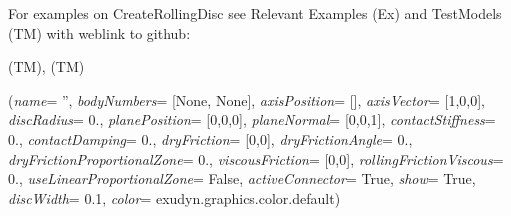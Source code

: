 %
\noindent For examples on CreateRollingDisc see Relevant Examples (Ex) and TestModels (TM) with weblink to github:
\bi
 \item \footnotesize {} (TM), 
 (TM)
\ei

%
\begin{flushleft}
\label{sec:mainsystemextensions:CreateRollingDiscPenalty}
({\it name}= '', {\it bodyNumbers}= [None, None], {\it axisPosition}= [], {\it axisVector}= [1,0,0], {\it discRadius}= 0., {\it planePosition}= [0,0,0], {\it planeNormal}= [0,0,1], {\it contactStiffness}= 0., {\it contactDamping}= 0., {\it dryFriction}= [0,0], {\it dryFrictionAngle}= 0., {\it dryFrictionProportionalZone}= 0., {\it viscousFriction}= [0,0], {\it rollingFrictionViscous}= 0., {\it useLinearProportionalZone}= False, {\it activeConnector}= True, {\it show}= True, {\it discWidth}= 0.1, {\it color}= exudyn.graphics.color.default)
\end{flushleft}
\setlength{\itemindent}{0.7cm}
